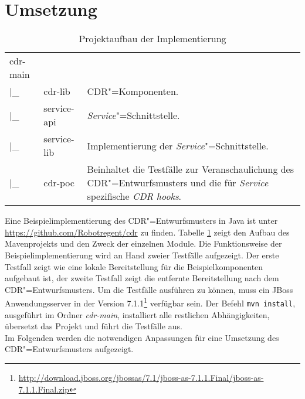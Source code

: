 \section{Umsetzung\label{sec:implementation}}
\begin{table}
\caption{\label{tab:project}Projektaufbau der Implementierung}
\begin{tabular}{lp{2cm}p{8cm}}
cdr-main &             & \\
|\_      & cdr-lib     & \ac{CDR}"=Komponenten.\\
|\_      & service-api & \textit{Service}"=Schnittstelle.\\
|\_      & service-lib & Implementierung der \textit{Service}"=Schnittstelle.\\
|\_      & cdr-poc     & Beinhaltet die Testfälle zur Veranschaulichung des \ac{CDR}"=Entwurfsmusters und die für \textit{Service} spezifische \textit{CDR hooks}.\\
\end{tabular}
\end{table}
Eine Beispielimplementierung des \ac{CDR}"=Entwurfsmusters in Java ist unter \href{https://github.com/Robotregent/cdr}{https://github.com/Robotregent/cdr} zu finden. 
Tabelle \ref{tab:project} zeigt den Aufbau des Mavenprojekts und den Zweck der einzelnen Module.
Die Funktionsweise der Beispielimplementierung wird an Hand zweier Testfälle aufgezeigt. Der erste Testfall zeigt wie eine lokale Bereitstellung für die Beispielkomponenten aufgebaut ist, der zweite Testfall zeigt die entfernte Bereitstellung nach dem \ac{CDR}"=Entwurfsmusters.
Um die Testfälle ausführen zu können, muss ein JBoss Anwendungsserver in der Version 7.1.1\footnote{\href{http://download.jboss.org/jbossas/7.1/jboss-as-7.1.1.Final/jboss-as-7.1.1.Final.zip}{{http://download.jboss.org/jbossas/7.1/jboss-as-7.1.1.Final/jboss-as-7.1.1.Final.zip}}} verfügbar sein.  
Der Befehl \colorbox{mygray}{\lstinline!mvn install!}, ausgeführt im Ordner \textit{cdr-main}, installiert alle restlichen Abhängigkeiten, übersetzt das Projekt und führt die Testfälle aus.\\
Im Folgenden werden die notwendigen Anpassungen für eine Umsetzung des \ac{CDR}"=Entwurfsmusters aufgezeigt.
